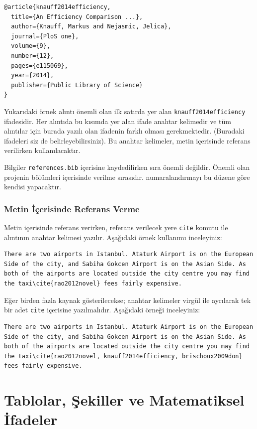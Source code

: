 \begin{verbatim}
@article{knauff2014efficiency,
  title={An Efficiency Comparison ...},
  author={Knauff, Markus and Nejasmic, Jelica},
  journal={PloS one},
  volume={9},
  number={12},
  pages={e115069},
  year={2014},
  publisher={Public Library of Science}
}
\end{verbatim}

Yukarıdaki örnek alıntı önemli olan ilk satırda yer alan \texttt{knauff2014efficiency} ifadesidir. Her alıntıda bu kısımda yer alan ifade anahtar kelimedir ve tüm alıntılar için burada yazılı olan ifadenin farklı olması gerekmektedir. (Buradaki ifadeleri siz de belirleyebilirsiniz). Bu anahtar kelimeler, metin içerisinde referans verilirken kullanılacaktır.

Bilgiler \texttt{references.bib} içerisine kaydedilirken sıra önemli değildir. Önemli olan projenin bölümleri içerisinde verilme sırasıdır. \latex numaralandırmayı bu düzene göre kendisi yapacaktır.

\subsection{Metin İçerisinde Referans Verme}
Metin içerisinde referans verirken, referans verilecek yere \texttt{cite} komutu ile alıntının anahtar kelimesi yazılır. Aşağıdaki örnek kullanımı inceleyiniz:

\begin{verbatim}
There are two airports in Istanbul. Ataturk Airport is on the European Side of the city, and Sabiha Gokcen Airport is on the Asian Side. As both of the airports are located outside the city centre you may find the taxi\cite{rao2012novel} fees fairly expensive. 
\end{verbatim}

Eğer birden fazla kaynak gösterilecekse; anahtar kelimeler virgül ile ayrılarak tek bir adet \texttt{cite} içerisine yazılmalıdır. Aşağıdaki örneği inceleyiniz:

\begin{verbatim}
There are two airports in Istanbul. Ataturk Airport is on the European Side of the city, and Sabiha Gokcen Airport is on the Asian Side. As both of the airports are located outside the city centre you may find the taxi\cite{rao2012novel, knauff2014efficiency, brischoux2009don} fees fairly expensive. 
\end{verbatim}

\chapter{Tablolar, Şekiller ve Matematiksel İfadeler}

